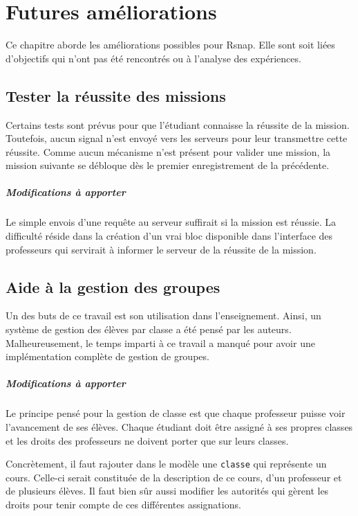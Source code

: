 \chapter{Futures améliorations}
Ce chapitre aborde les améliorations possibles pour Rsnap. Elle sont soit liées d'objectifs qui n'ont pas été rencontrés ou à l'analyse des expériences.

\section{Tester la réussite des missions}
Certains tests sont prévus pour que l'étudiant connaisse la réussite de la mission. Toutefois, aucun signal n'est envoyé vers les serveurs pour leur transmettre cette réussite. Comme aucun mécanisme n'est présent pour valider une mission, la mission suivante se débloque dès le premier enregistrement de la précédente.

\paragraph{Modifications à apporter}
Le simple envois d'une requête au serveur suffirait si la mission est réussie. La difficulté réside dans la création d'un vrai bloc disponible dans l'interface des professeurs qui servirait à informer le serveur de la réussite de la mission.

\section{Aide à la gestion des groupes}
Un des buts de ce travail est son utilisation dans l'enseignement. Ainsi, un système de gestion des élèves par classe a été pensé par les auteurs. Malheureusement, le temps imparti à ce travail a manqué pour avoir une implémentation complète de gestion de groupes.

\paragraph{Modifications à apporter}
Le principe pensé pour la gestion de classe est que chaque professeur puisse voir l'avancement de ses élèves. Chaque étudiant doit être assigné à ses propres classes et les droits des professeurs ne doivent porter que sur leurs classes.

Concrètement, il faut rajouter dans le modèle une \texttt{classe} qui représente un cours. Celle-ci serait constituée de la description de ce cours, d'un professeur et de plusieurs élèves. Il faut bien sûr aussi modifier les autorités qui gèrent les droits pour tenir compte de ces différentes assignations.

